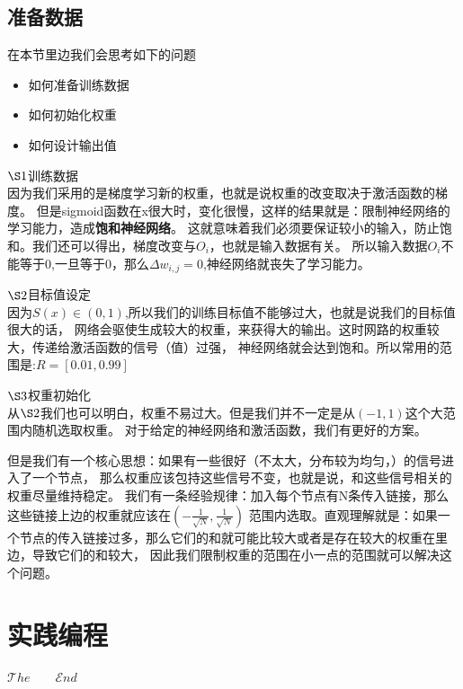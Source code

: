 \documentclass[12pt]{article}
\begin{document}
    \subsection{准备数据}
    在本节里边我们会思考如下的问题
    \begin{itemize}
        \item 如何准备训练数据
        \item 如何初始化权重
        \item 如何设计输出值
    \end{itemize}

    $\S1$训练数据\\
    因为我们采用的是梯度学习新的权重，也就是说权重的改变取决于激活函数的梯度。
    但是sigmoid函数在x很大时，变化很慢，这样的结果就是：限制神经网络的学习能力，造成\textbf{饱和神经网络}。
    这就意味着我们必须要保证较小的输入，防止饱和。我们还可以得出，梯度改变与$O_i$，也就是输入数据有关。
    所以输入数据$O_i$不能等于0,一旦等于0，那么$\Delta w_{i,j}=0$,神经网络就丧失了学习能力。
    
    $\S2$目标值设定\\
    因为$S(x)\in (0,1)$,所以我们的训练目标值不能够过大，也就是说我们的目标值很大的话，
    网络会驱使生成较大的权重，来获得大的输出。这时网路的权重较大，传递给激活函数的信号（值）过强，
    神经网络就会达到饱和。所以常用的范围是:$R = [0.01,0.99]$

    $\S3$权重初始化\\
    从$\S2$我们也可以明白，权重不易过大。但是我们并不一定是从$(-1,1)$这个大范围内随机选取权重。
    对于给定的神经网络和激活函数，我们有更好的方案。

    但是我们有一个核心思想：如果有一些很好（不太大，分布较为均匀，）的信号进入了一个节点，
    那么权重应该包持这些信号不变，也就是说，和这些信号相关的权重尽量维持稳定。
    我们有一条经验规律：加入每个节点有N条传入链接，那么这些链接上边的权重就应该在$(-\frac{1}{\sqrt{N}},\frac{1}{\sqrt{N}})$
    范围内选取。直观理解就是：如果一个节点的传入链接过多，那么它们的和就可能比较大或者是存在较大的权重在里边，导致它们的和较大，
    因此我们限制权重的范围在小一点的范围就可以解决这个问题。

    \section{实践编程}
    \vspace{12em}
    \begin{center}
        \Huge
        $\mathscr{T}he\qquad \mathscr{E}nd$
    \end{center}


    
\end{document}
